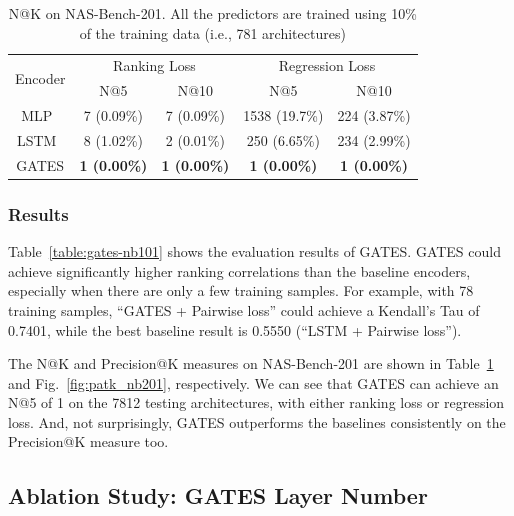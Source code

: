 \documentclass[runningheads]{llncs}
\begin{document}
\begin{table}[th]
  \vspace{-5pt}
  \caption{N@K on NAS-Bench-201. All the predictors are trained using 10\% of the training data (i.e., 781 architectures)}
  \label{table:natk-nb201}
  \vspace{-5pt}
  \begin{center}
    \begin{tabular}{c@{\hskip 0.02\linewidth}cccc}
      \toprule
      \multirow{2}{*}{Encoder} & \multicolumn{2}{c}{Ranking Loss} &  \multicolumn{2}{c}{Regression Loss} \\ 
      \cmidrule(lr){2-3}\cmidrule(lr){4-5} & N@5 & N@10 & N@5 & N@10  \\ \midrule
      MLP~\cite{wang2018alphax}  &    7 (0.09\%)    &    7 (0.09\%)   &   1538 (19.7\%)   &   224 (3.87\%)    \\
      LSTM~\cite{wang2018alphax}     &  8 (1.02\%)  &   2 (0.01\%) &  250 (6.65\%)   & 234 (2.99\%)  \\
      \hline
      GATES & {\bf 1 (0.00\%)} & {\bf 1 (0.00\%)} & {\bf 1 (0.00\%)} & {\bf 1 (0.00\%)} \\\bottomrule
    \end{tabular}
  \end{center}
  \vspace{-15pt}
\end{table}

\subsubsection{Results}
Table~\ref{table:gates-nb101} shows the evaluation results of GATES. GATES could achieve significantly higher ranking correlations than the baseline encoders, especially when there are only a few training samples. For example, with 78 training samples, ``GATES + Pairwise loss'' could achieve a Kendall's Tau of 0.7401, while the best baseline result is 0.5550 (``LSTM + Pairwise loss'').

The N@K and Precision@K measures on NAS-Bench-201 are shown in Table~\ref{table:natk-nb201} and Fig.~\ref{fig:patk_nb201}, respectively. 
We can see that GATES can achieve an N@5 of 1 on the 7812 testing architectures, with either ranking loss or regression loss. And, not surprisingly, GATES outperforms the baselines consistently on the Precision@K measure too.



\subsection{Ablation Study: GATES Layer Number}
\label{sec:exp-ablation-layernum}
\end{document}
